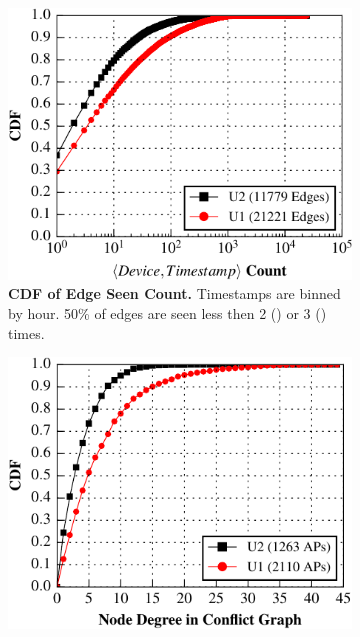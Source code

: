\begin{figure}[t]
  \centering
  \begin{minipage}[b]{0.65\textwidth}
    \begin{subfigure}[t]{0.48\textwidth}
      \includegraphics[width=\columnwidth]{./figures/CampusConflictWeight.pdf}
      \caption{\textbf{CDF of Edge Seen Count.} Timestamps are binned by hour. 50\%
      of edges are seen less then 2 (\nd{}) or 3 (\ub{}) times.}
      \label{fig:campus_edge_weight}
    \end{subfigure}\hspace{0.02\textwidth}%
    \begin{subfigure}[t]{0.48\textwidth}
      \includegraphics[width=\columnwidth]{./figures/CampusConflictDegree.pdf}

\end{subfigure}
\end{minipage}
\end{figure}
